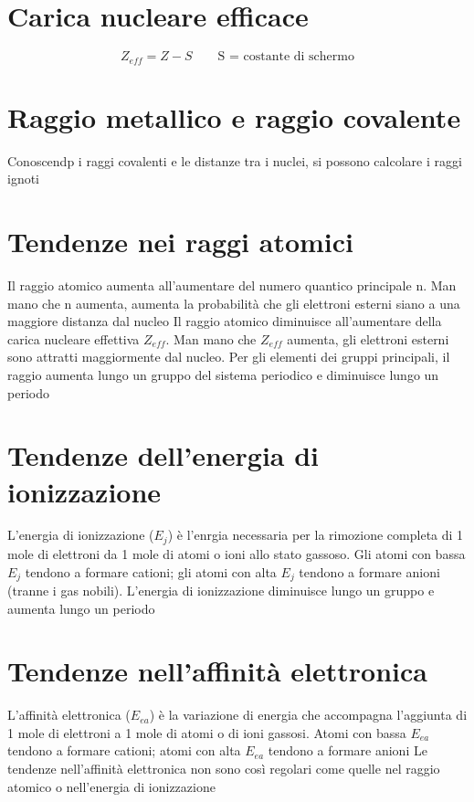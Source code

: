 \documentclass[a4paper,11pt]{report}
\begin{document}
\section{Carica nucleare efficace}

\begin{equation*}
	Z_{eff} = Z - S \qquad \text{S = costante di schermo}
\end{equation*}

\section{Raggio metallico e raggio covalente}

Conoscendp i raggi covalenti e le distanze tra i nuclei, si possono calcolare i raggi ignoti

\section{Tendenze nei raggi atomici}

Il raggio atomico aumenta all'aumentare del numero quantico principale n. Man mano che n aumenta, aumenta la probabilità che gli elettroni esterni siano a una maggiore distanza dal nucleo \newline
Il raggio atomico diminuisce all'aumentare della carica nucleare effettiva $Z_{eff}$. Man mano che $Z_{eff}$ aumenta, gli elettroni esterni sono attratti maggiormente dal nucleo. \newline
Per gli elementi dei gruppi principali, il raggio aumenta lungo un gruppo del sistema periodico e diminuisce lungo un periodo

\section{Tendenze dell'energia di ionizzazione}

L'energia di ionizzazione ($E_j$) è l'enrgia necessaria per la rimozione completa di 1 mole di elettroni da 1 mole di atomi o ioni allo stato gassoso. Gli atomi con bassa $E_j$ tendono a formare cationi; gli atomi con alta $E_j$ tendono a formare anioni (tranne i gas nobili). L'energia di ionizzazione diminuisce lungo un gruppo e aumenta lungo un periodo

\section{Tendenze nell'affinità elettronica}

L'affinità elettronica ($E_{ea}$) è la variazione di energia che accompagna l'aggiunta di 1 mole di elettroni a 1 mole di atomi o di ioni gassosi. Atomi con bassa $E_{ea}$ tendono a formare cationi; atomi con alta $E_{ea}$ tendono a formare anioni \newline
Le tendenze nell'affinità elettronica non sono così regolari come quelle nel raggio atomico o nell'energia di ionizzazione 
\end{document}
